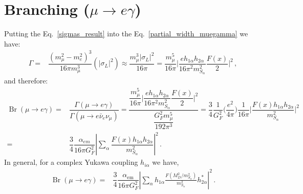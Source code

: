 \section{ Branching ($\mu \rightarrow e \gamma$)}
Putting the Eq.~\eqref{sigmas_result} into the Eq.~\eqref{partial_width_muegamma} we have:
\begin{align}
\Gamma =&\dfrac{(m_{\mu}^2-m_e^2)^3}{16\pi m_{\mu}^3}(|\sigma_L|^2) \approx \dfrac{m_{\mu}^3 |\sigma_L|^2}{16\pi}
= \dfrac{m_{\mu}^5}{16\pi}\bigg| \dfrac{e h_{1\alpha}h_{2\alpha}}{16 \pi^2 m_{S_\alpha}^2} \dfrac{F(x)}{2} \bigg|^2\,,
\end{align}
and therefore:
\begin{align}
\operatorname{Br}(\mu \rightarrow e \gamma) 
=& \dfrac{\Gamma(\mu \rightarrow e \gamma )}{\Gamma(\mu \rightarrow e \bar{\nu}_e \nu_{\mu})}
=\dfrac{\dfrac{m_{\mu}^5}{16\pi}\bigg| \dfrac{e h_{1\alpha}h_{2\alpha}}{16 \pi^2 m_{S_\alpha}^2} \dfrac{F(x)}{2} \bigg|^2}{ \dfrac{G_F^2 m_{\mu}^5}{192\pi^3} }
=\dfrac{3}{4}\dfrac{1}{G_F^2}\bigg(\dfrac{e^2}{4\pi}\bigg)\dfrac{1}{16\pi}\bigg|\dfrac{F(x)h_{1\alpha}h_{2\alpha}}{m_{S_\alpha}^2}\bigg|^2 \nonumber \\
=&\dfrac{3}{4}\dfrac{\alpha_{em}}{16 \pi G_F^2}\left|\sum_{\alpha}\dfrac{F(x)h_{1\alpha}h_{2\alpha}}{m_{S_\alpha}^2}  \right|^2 \,.
\end{align}
%
In general, for a complex Yukawa coupling $h_{i\alpha}$ we have,
\begin{align}
\operatorname{Br}(\mu \rightarrow e \gamma)=&\dfrac{3}{4}\dfrac{\alpha_{\text{em}}}{16 \pi G_F^2}\left|\sum_{\alpha}
h_{1\alpha}\frac{F\left(M_D^2/m_{S_{\alpha}}^2  \right) }{m_{S_\alpha}^2}h_{2\alpha}^{*}  \right|^2 \,.
\end{align}
